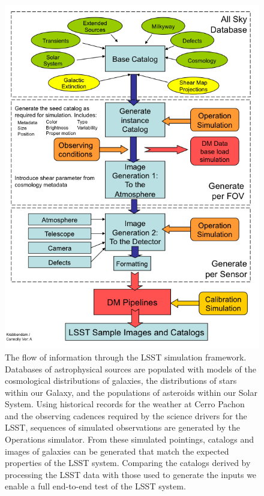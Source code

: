 \documentclass[]{article}
\begin{document}
{\begin{figure}[H]
\centerline{\includegraphics[width=6in]{validation_figures/flow.png}}
%
%
\caption{The flow of information through the LSST simulation
  framework. Databases of astrophysical sources are populated with
  models of the cosmological distributions of galaxies, the
  distributions of stars within our Galaxy, and the populations of
  asteroids within our Solar System. Using historical records for the
  weather at Cerro Pachon and the observing cadences required by the
  science drivers for the LSST, sequences of simulated observations
  are generated by the Operations simulator. From these simulated
  pointings, catalogs and images of galaxies can be generated that
  match the expected properties of the LSST system. Comparing the
  catalogs derived by processing the LSST data with those used to
  generate the inputs we enable a full end-to-end test of the LSST
  system.}
\label{fig:flow}       %
\end{figure}


}
\end{document}

